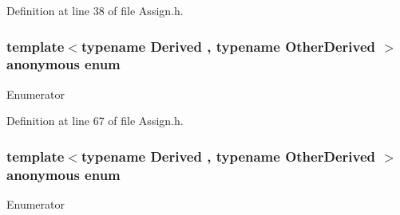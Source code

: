 Definition at line 38 of file Assign.\-h.

\hypertarget{structei__assign__traits_ac1a4600997e18e41b5bb63318a19f25b}{\subsubsection[{anonymous enum}]{\setlength{\rightskip}{0pt plus 5cm}template$<$typename Derived , typename Other\-Derived $>$ anonymous enum}}\label{structei__assign__traits_ac1a4600997e18e41b5bb63318a19f25b}
\begin{Desc}
\item[Enumerator]\par
\begin{description}
\item[{\em 
\hypertarget{structei__assign__traits_ac1a4600997e18e41b5bb63318a19f25ba2542ac1ebcb19cf17e3274b6faabeab1}{Vectorization}\label{structei__assign__traits_ac1a4600997e18e41b5bb63318a19f25ba2542ac1ebcb19cf17e3274b6faabeab1}
}]\end{description}
\end{Desc}


Definition at line 67 of file Assign.\-h.

\hypertarget{structei__assign__traits_a6c8bcbf7c2c8e287c2c52b4e01f0c8ca}{\subsubsection[{anonymous enum}]{\setlength{\rightskip}{0pt plus 5cm}template$<$typename Derived , typename Other\-Derived $>$ anonymous enum}}\label{structei__assign__traits_a6c8bcbf7c2c8e287c2c52b4e01f0c8ca}
\begin{Desc}
\item[Enumerator]\par
\begin{description}
\item[{\em 
\hypertarget{structei__assign__traits_a6c8bcbf7c2c8e287c2c52b4e01f0c8caac94f4e3749ec7e4ddb82e1cb0962c355}{Unrolling}\label{structei__assign__traits_a6c8bcbf7c2c8e287c2c52b4e01f0c8caac94f4e3749ec7e4ddb82e1cb0962c355}
}]\end{description}
\end{Desc}


